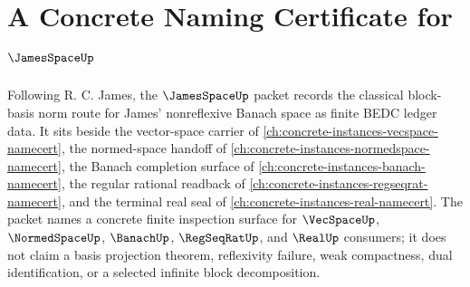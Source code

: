 \chapter{A Concrete Naming Certificate for $\JamesSpaceUp$}
\label{ch:concrete-instances-james-space-namecert}

Following R. C. James, the $\JamesSpaceUp$ packet records the classical block-basis norm route for James' nonreflexive Banach space as finite BEDC ledger data. It sits beside the vector-space carrier of \autoref{ch:concrete-instances-vecspace-namecert}, the normed-space handoff of \autoref{ch:concrete-instances-normedspace-namecert}, the Banach completion surface of \autoref{ch:concrete-instances-banach-namecert}, the regular rational readback of \autoref{ch:concrete-instances-regseqrat-namecert}, and the terminal real seal of \autoref{ch:concrete-instances-real-namecert}. The packet names a concrete finite inspection surface for $\VecSpaceUp$, $\NormedSpaceUp$, $\BanachUp$, $\RegSeqRatUp$, and $\RealUp$ consumers; it does not claim a basis projection theorem, reflexivity failure, weak compactness, dual identification, or a selected infinite block decomposition.

